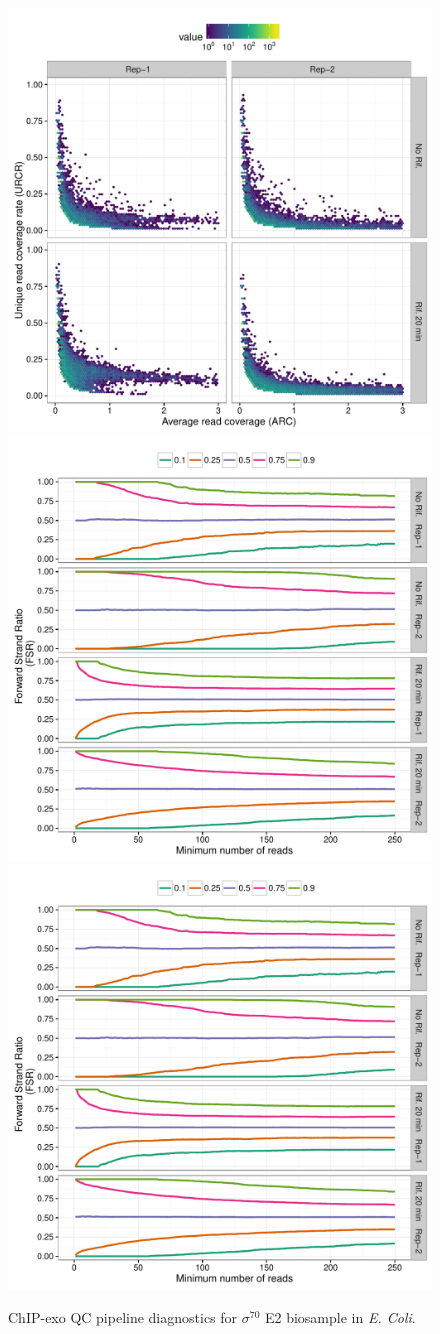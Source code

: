\documentclass{article}
\begin{document}
\begin{figure}[H]
  \centering
  \includegraphics[width = .5\textwidth,page =
1]{figures/supplement/QC/Sig70_bios2_enrichment.pdf}\\
\includegraphics[width = .45\textwidth,page =
1]{figures/supplement/QC/Sig70_bios2_strand_imbalance.pdf}
\includegraphics[width = .45\textwidth,page =
3]{figures/supplement/QC/Sig70_bios2_strand_imbalance.pdf}
\caption{ChIP-exo QC pipeline diagnostics for $\sigma^{70}$ E2
  biosample in \emph{E. Coli}.}
  \label{sfig:qc2}
\end{figure}
\end{document}
